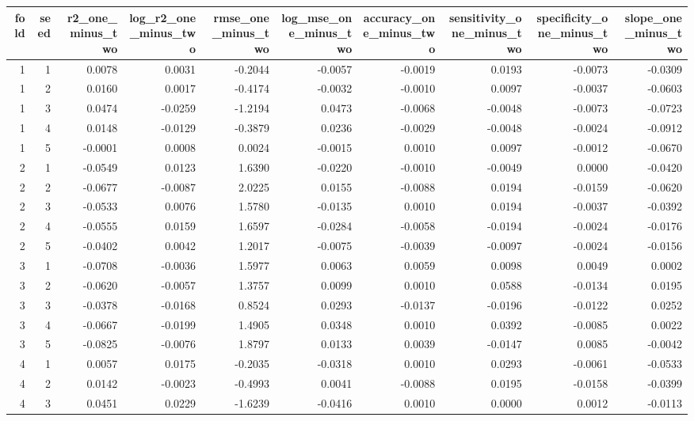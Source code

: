 \begin{tabular}{rrrrrrrrrr}
\toprule
fold & seed & r2\_one\_minus\_two & log\_r2\_one\_minus\_two & rmse\_one\_minus\_two & log\_mse\_one\_minus\_two & accuracy\_one\_minus\_two & sensitivity\_one\_minus\_two & specificity\_one\_minus\_two & slope\_one\_minus\_two \\
\midrule
1 & 1 & 0.0078 & 0.0031 & -0.2044 & -0.0057 & -0.0019 & 0.0193 & -0.0073 & -0.0309 \\
1 & 2 & 0.0160 & 0.0017 & -0.4174 & -0.0032 & -0.0010 & 0.0097 & -0.0037 & -0.0603 \\
1 & 3 & 0.0474 & -0.0259 & -1.2194 & 0.0473 & -0.0068 & -0.0048 & -0.0073 & -0.0723 \\
1 & 4 & 0.0148 & -0.0129 & -0.3879 & 0.0236 & -0.0029 & -0.0048 & -0.0024 & -0.0912 \\
1 & 5 & -0.0001 & 0.0008 & 0.0024 & -0.0015 & 0.0010 & 0.0097 & -0.0012 & -0.0670 \\
2 & 1 & -0.0549 & 0.0123 & 1.6390 & -0.0220 & -0.0010 & -0.0049 & 0.0000 & -0.0420 \\
2 & 2 & -0.0677 & -0.0087 & 2.0225 & 0.0155 & -0.0088 & 0.0194 & -0.0159 & -0.0620 \\
2 & 3 & -0.0533 & 0.0076 & 1.5780 & -0.0135 & 0.0010 & 0.0194 & -0.0037 & -0.0392 \\
2 & 4 & -0.0555 & 0.0159 & 1.6597 & -0.0284 & -0.0058 & -0.0194 & -0.0024 & -0.0176 \\
2 & 5 & -0.0402 & 0.0042 & 1.2017 & -0.0075 & -0.0039 & -0.0097 & -0.0024 & -0.0156 \\
3 & 1 & -0.0708 & -0.0036 & 1.5977 & 0.0063 & 0.0059 & 0.0098 & 0.0049 & 0.0002 \\
3 & 2 & -0.0620 & -0.0057 & 1.3757 & 0.0099 & 0.0010 & 0.0588 & -0.0134 & 0.0195 \\
3 & 3 & -0.0378 & -0.0168 & 0.8524 & 0.0293 & -0.0137 & -0.0196 & -0.0122 & 0.0252 \\
3 & 4 & -0.0667 & -0.0199 & 1.4905 & 0.0348 & 0.0010 & 0.0392 & -0.0085 & 0.0022 \\
3 & 5 & -0.0825 & -0.0076 & 1.8797 & 0.0133 & 0.0039 & -0.0147 & 0.0085 & -0.0042 \\
4 & 1 & 0.0057 & 0.0175 & -0.2035 & -0.0318 & 0.0010 & 0.0293 & -0.0061 & -0.0533 \\
4 & 2 & 0.0142 & -0.0023 & -0.4993 & 0.0041 & -0.0088 & 0.0195 & -0.0158 & -0.0399 \\
4 & 3 & 0.0451 & 0.0229 & -1.6239 & -0.0416 & 0.0010 & 0.0000 & 0.0012 & -0.0113 \\

\end{tabular}
